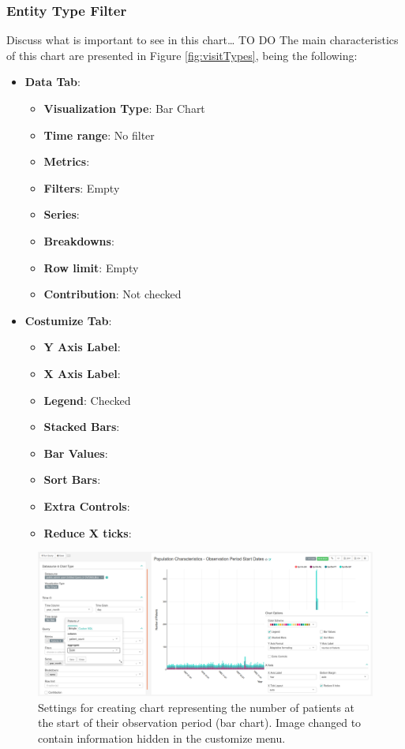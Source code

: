 \documentclass[]{book}
\providecommand{\tightlist}{%
  \setlength{\itemsep}{0pt}\setlength{\parskip}{0pt}}
\begin{document}
\subsubsection{Entity Type Filter}\label{entity-type-filter}

Discuss what is important to see in this chart\ldots{} TO DO The main
characteristics of this chart are presented in Figure
\ref{fig:visitTypes}, being the following:

\begin{itemize}
\tightlist
\item
  \textbf{Data Tab}:

  \begin{itemize}
  \tightlist
  \item
    \textbf{Visualization Type}: Bar Chart
  \item
    \textbf{Time range}: No filter
  \item
    \textbf{Metrics}:
  \item
    \textbf{Filters}: Empty
  \item
    \textbf{Series}:
  \item
    \textbf{Breakdowns}:
  \item
    \textbf{Row limit}: Empty
  \item
    \textbf{Contribution}: Not checked
  \end{itemize}
\item
  \textbf{Costumize Tab}:

  \begin{itemize}
  \tightlist
  \item
    \textbf{Y Axis Label}:
  \item
    \textbf{X Axis Label}:
  \item
    \textbf{Legend}: Checked
  \item
    \textbf{Stacked Bars}:
  \item
    \textbf{Bar Values}:
  \item
    \textbf{Sort Bars}:
  \item
    \textbf{Extra Controls}:
  \item
    \textbf{Reduce X ticks}:
  \end{itemize}
\end{itemize}

\begin{figure}
\includegraphics[width=1\linewidth]{images/populationCharacteristicsObservationPeriodStartDates} \caption{Settings for creating chart representing the number of patients at the start of their observation period (bar chart). Image changed to contain information hidden in the customize menu.}\label{fig:visitTypes6}
\end{figure}
\end{document}
